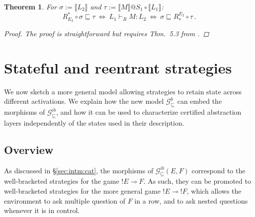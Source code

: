 \documentclass[draft,11pt]{report}
\newtheorem{lemma}{Lemma}
\newtheorem{theorem}{Theorem}
\newcommand{\gcat}{\mathcal{G}_{\sqsubseteq}}
\begin{document}

\begin{theorem}
For
$\sigma := \llbracket L_2 \rrbracket$ and
$\tau := \llbracket M \rrbracket @ S_1 \circ \llbracket L_1 \rrbracket$:
\[
  R^*_{E_2} \!\circ \sigma \sqsubseteq \tau
  \: \Leftrightarrow \:
  L_1 \vdash_R M : L_2
  \: \Leftrightarrow \:
  \sigma \sqsubseteq R_*^{E_2} \!\circ \tau \,.
\]
\begin{proof}
The proof is straightforward but requires
Thm.~5.3 from \citet{dndf}.
\end{proof}
\end{theorem}




\chapter{Stateful and reentrant strategies} \label{sec:gamesem} %

We now sketch a more general model
allowing strategies to retain state
across different activations.
We explain how the new model $\gcat^b$ can embed
the morphisms of $\gcat^{ib}$,
and how it can be used to characterize
certified abstraction layers
independently of the states used in their description.

\section{Overview} %
\label{sec:arrow}

As discussed in \S\ref{sec:intm:cat},
the morphisms of $\gcat^{ib}(E, F)$
correspond to the well-bracketed strategies
for the game ${!E} \multimap F$.
As such, they can be promoted to well-bracketed strategies for
the more general game ${!E} \multimap {!F}$,
which allows the environment to ask
multiple question of $F$ in a row,
and to ask nested questions
whenever it is in control.
\end{document}
